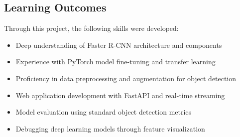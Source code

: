 \documentclass[12pt,a4paper]{article}
\begin{document}
\subsection{Learning Outcomes}

Through this project, the following skills were developed:

\begin{itemize}
    \item Deep understanding of Faster R-CNN architecture and components
    \item Experience with PyTorch model fine-tuning and transfer learning
    \item Proficiency in data preprocessing and augmentation for object detection
    \item Web application development with FastAPI and real-time streaming
    \item Model evaluation using standard object detection metrics
    \item Debugging deep learning models through feature visualization
\end{itemize}
\end{document}
